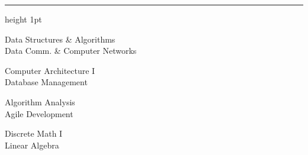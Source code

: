\documentclass[letter]{article}
\begin{document}
    \vspace{4pt}
    \hrule height 1pt
    \vspace{4pt}
    \noindent
    \begin{minipage}[c]{0.29\linewidth}
        \noindent Data Structures \& Algorithms \\
        \noindent Data Comm. \& Computer Networks \\
    \end{minipage}
    \begin{minipage}[c]{0.29\linewidth}
        \noindent Computer Architecture I \\
        \noindent Database Management \\
    \end{minipage}
    \begin{minipage}[c]{0.29\linewidth}
        \noindent Algorithm Analysis \\
        \noindent Agile Development \\
    \end{minipage}
        \begin{minipage}[c]{0.29\linewidth}
        \noindent Discrete Math I \\
        \noindent Linear Algebra \\
    \end{minipage}
\end{document}
